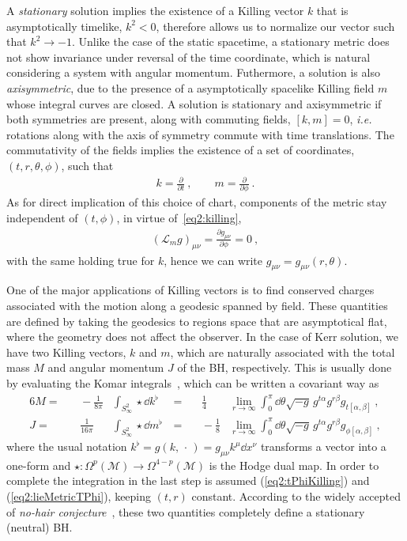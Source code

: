A \emph{stationary} solution implies the existence of a Killing vector $k$ that is asymptotically timelike, $k^2<0$, therefore allows us to normalize our vector such that $k^2 \rightarrow -1$. 
Unlike the case of the static spacetime, a stationary metric does not show invariance under reversal of the time coordinate, which is natural considering a system with angular momentum. 
Futhermore, a solution is also \emph{axisymmetric}, due to the presence of a asymptotically spacelike Killing field $m$ whose integral curves are closed. A solution is stationary and axisymmetric if both symmetries are present, along with commuting fields, $[k , m] = 0$, \emph{i.e.} rotations along with the axis of symmetry commute with time translations. The commutativity of the fields implies the existence of a set of coordinates, $(t,r,\theta,\phi)$, such that
\begin{align}
    k = \frac{\partial}{\partial t} ~, \qquad m = \frac{\partial}{\partial \phi} ~.
    \label{eq2:tPhiKilling}
\end{align}
As for direct implication of this choice of chart, components of the metric stay independent of $(t,\phi)$, in virtue of~\eqref{eq2:killing},
\begin{align}
    (\mathcal{L}_m g)_{\mu\nu} = \frac{\partial g_{\mu\nu}}{\partial \phi} = 0 ~,
    \label{eq2:lieMetricTPhi}
\end{align}
with the same holding true for $k$, hence we can write $g_{\mu\nu} = g_{\mu\nu}(r,\theta)$. 

One of the major applications of Killing vectors is to find conserved charges associated with the motion along a geodesic spanned by field.
These quantities are defined by taking the geodesics to regions space that are asymptotical flat, where the geometry does not affect the observer.
In the case of Kerr solution, we have two Killing vectors, $k$ and $m$, which are naturally associated with the total mass $M$ and angular momentum $J$ of the BH, respectively.
This is usually done by evaluating the Komar integrals~\cite{Heusler1996, Wald2010}, which can be written a covariant way as
\begin{alignat}{6}
    M = &&\, -\frac{1}{8 \pi} & \int_{S^2_\infty} \star \dd k^\flat \,& = &&\, \frac{1}{4} & \lim_{r\to\infty}  \int_0^\pi \dd\theta \sqrt{-g} \, g^{t\alpha} g^{r\beta} g_{t[\alpha,\beta]} ~, \label{eq2:komarMass} \\
    J = &&\, \frac{1}{16 \pi} & \int_{S^2_\infty} \star \dd m^\flat \,& = &&\, - \frac{1}{8} & \lim_{r\to\infty}  \int_0^\pi \dd\theta \sqrt{-g} \, g^{t\alpha} g^{r\beta} g_{\phi[\alpha,\beta]} ~, \label{eq2:komarSpin}
\end{alignat}
where the usual notation $k^\flat = g(k, \,\cdot\,) = g_{\mu\nu} k^\mu \dd x^\nu$ transforms a vector into a one-form and $\star : \Omega^{p}(\mathcal{M})\to\Omega^{4-p}(\mathcal{M})$ is the Hodge dual map. In order to complete the integration in the last step is assumed (\ref{eq2:tPhiKilling}) and (\ref{eq2:lieMetricTPhi}), keeping $(t,r)$ constant. According to the widely accepted of \emph{no-hair conjecture}~\cite{Carter1971}, these two quantities completely define a stationary (neutral) BH. 



